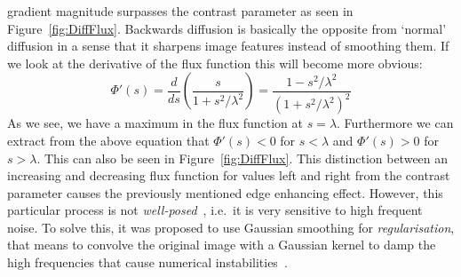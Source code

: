 gradient magnitude surpasses the contrast parameter as seen in Figure~\ref{fig:DiffFlux}. Backwards
diffusion is basically the opposite from `normal' diffusion in a sense that it sharpens image
features instead of smoothing them.
If we look at the derivative of the flux function this will become more obvious:
\begin{equation}
    \Phi'(s) = \frac{d}{ds} \left(\frac{s}{1 + s^2/\lambda^2}\right) = 
    \frac{1 - s^2/\lambda^2}{{\left(1 + s^2/\lambda^2\right)}^2}
\end{equation}
As we see, we have a maximum in the flux function at $s = \lambda$. Furthermore we can extract from
the above equation that $\Phi'(s) < 0$ for $s < \lambda$ and $\Phi'(s) > 0$ for $s > \lambda$. This
can also be seen in Figure~\ref{fig:DiffFlux}. This distinction between an increasing and decreasing flux
function for values left and right from the contrast parameter causes the previously mentioned
edge enhancing effect.\newpage\noindent
However, this particular process is not \textit{well-posed}~\cite{weickert96}, i.e.\ it is very
sensitive to high frequent noise. To solve this, it was proposed to use Gaussian smoothing for
\textit{regularisation}, that means to convolve the original image with a Gaussian kernel to damp the high
frequencies that cause numerical instabilities~\cite{catte-lions-morel92}.

